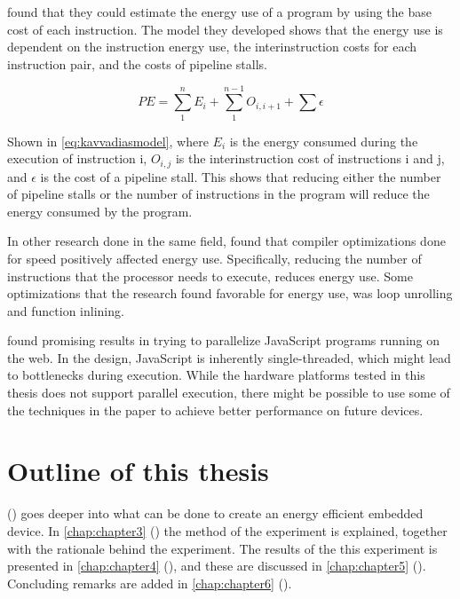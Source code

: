 \citet{kavvadias04} found that they could estimate the energy use of a program by using the base cost of each instruction.
The model they developed shows that the energy use is dependent on the instruction energy use, the interinstruction costs for each instruction pair, and the costs of pipeline stalls.

\begin{equation}
PE = \sum_{1}^{n}E_{i} + \sum_{1}^{n-1}O_{i,i+1} + \sum\epsilon
\label{eq:kavvadiasmodel}
\end{equation}

Shown in \cref{eq:kavvadiasmodel}, where $E_i$ is the energy consumed during the execution of instruction i, $O_{i,j}$ is the interinstruction cost of instructions i and j, and $\epsilon$ is the cost of a pipeline stall.
This shows that reducing either the number of pipeline stalls or the number of instructions in the program will reduce the energy consumed by the program.

In other research done in the same field, \citet{valluri01} found that compiler optimizations done for speed positively affected energy use.
Specifically, reducing the number of instructions that the processor needs to execute, reduces energy use.
Some optimizations that the research found favorable for energy use, was loop unrolling and function inlining.

\citet{fortunaanderson2010} found promising results in trying to parallelize JavaScript programs running on the web.
In the design, JavaScript is inherently single-threaded, which might lead to bottlenecks during execution.
While the hardware platforms tested in this thesis does not support parallel execution, there might be possible to use some of the techniques in the paper to achieve better performance on future devices.





\section{Outline of this thesis}
 () goes deeper into what can be done to create an energy efficient embedded device.
In \cref{chap:chapter3} () the method of the experiment is explained, together with the rationale behind the experiment.
The results of the this experiment is presented in \cref{chap:chapter4} (), and these are discussed in \cref{chap:chapter5} ().
Concluding remarks are added in \cref{chap:chapter6} ().